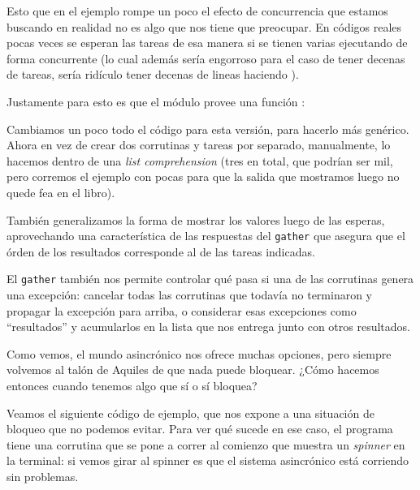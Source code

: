 Esto que en el ejemplo rompe un poco el efecto de concurrencia que estamos buscando en realidad no es algo que nos tiene que preocupar. En códigos reales pocas veces se esperan las tareas de esa manera si se tienen varias ejecutando de forma concurrente (lo cual además sería engorroso para el caso de tener decenas de tareas, sería ridículo tener decenas de lineas haciendo ). 

Justamente para esto es que el módulo  provee una función :


Cambiamos un poco todo el código para esta versión, para hacerlo más genérico. Ahora en vez de crear dos corrutinas y tareas por separado, manualmente, lo hacemos dentro de una \textit{list comprehension} (tres en total, que podrían ser mil, pero corremos el ejemplo con pocas para que la salida que mostramos luego no quede fea en el libro).

También generalizamos la forma de mostrar los valores luego de las esperas, aprovechando una característica de las respuestas del \texttt{gather} que asegura que el órden de los resultados corresponde al de las tareas indicadas.


El \texttt{gather} también nos permite controlar qué pasa si una de las corrutinas genera una excepción: cancelar todas las corrutinas que todavía no terminaron y propagar la excepción para arriba, o considerar esas excepciones como ``resultados'' y acumularlos en la lista que nos entrega junto con otros resultados.

Como vemos, el mundo asincrónico nos ofrece muchas opciones, pero siempre volvemos al talón de Aquiles de que nada puede bloquear. ¿Cómo hacemos entonces cuando tenemos algo que sí o sí bloquea?

Veamos el siguiente código de ejemplo, que nos expone a una situación de bloqueo que no podemos evitar. Para ver qué sucede en ese caso, el programa tiene una corrutina que se pone a correr al comienzo que muestra un \textit{spinner} en la terminal: si vemos girar al spinner es que el sistema asincrónico está corriendo sin problemas.

